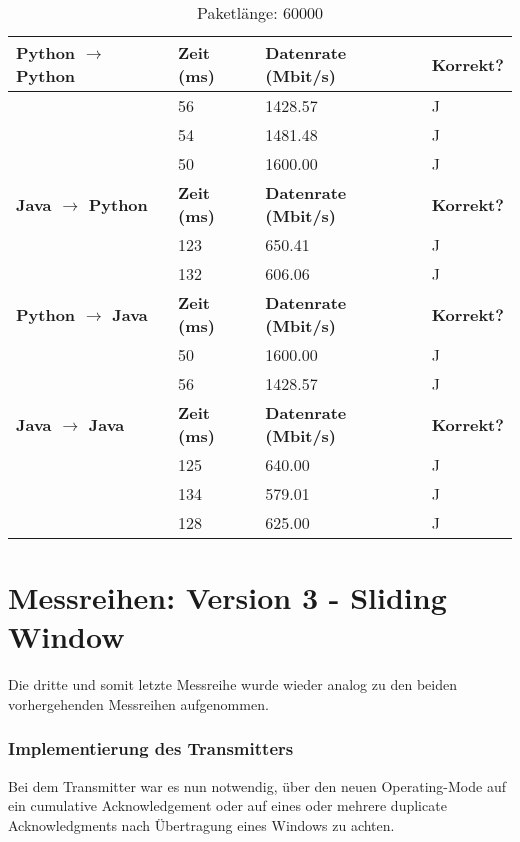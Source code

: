 \documentclass{article}
\begin{document}
    \begin{table}[]
        \caption{Paketlänge: 60000}
        \label{tab:my-tablev2_60000}
        \begin{tabular}{|l|l|l|l|}
            \hline
            \textbf{Python $\rightarrow$ Python} & \textbf{Zeit (ms)} & \textbf{Datenrate (Mbit/s)} & \textbf{Korrekt?} \\ \hline
            & 56       & 1428.57         & J        \\ \cline{2-4}
            & 54       & 1481.48         & J        \\ \cline{2-4}
            & 50       & 1600.00         & J        \\ \hline
            \textbf{Java $\rightarrow$ Python}   & \textbf{Zeit (ms)} & \textbf{Datenrate (Mbit/s)} & \textbf{Korrekt?} \\ \hline
            & 123      & 650.41          & J        \\ \cline{2-4}
            & 132      & 606.06          & J        \\ \hline
            \textbf{Python $\rightarrow$ Java}  & \textbf{Zeit (ms)} & \textbf{Datenrate (Mbit/s)} & \textbf{Korrekt?} \\ \hline
            & 50       & 1600.00         & J        \\ \cline{2-4}
            & 56       & 1428.57         & J        \\ \hline
            \textbf{Java $\rightarrow$ Java}   & \textbf{Zeit (ms)} & \textbf{Datenrate (Mbit/s)} & \textbf{Korrekt?} \\ \hline
            & 125      & 640.00          & J        \\ \cline{2-4}
            & 134      & 579.01          & J        \\ \cline{2-4}
            & 128      & 625.00          & J        \\ \hline
        \end{tabular}
    \end{table}

    \newpage

    \section{Messreihen: Version 3 - Sliding Window}
    Die dritte und somit letzte Messreihe wurde wieder analog zu den beiden vorhergehenden Messreihen aufgenommen.\\

    \subsubsection*{Implementierung des Transmitters}
    Bei dem Transmitter war es nun notwendig, über den neuen Operating-Mode auf ein cumulative Acknowledgement oder auf
    eines oder mehrere duplicate Acknowledgments nach Übertragung eines Windows zu achten.\\
\end{document}
